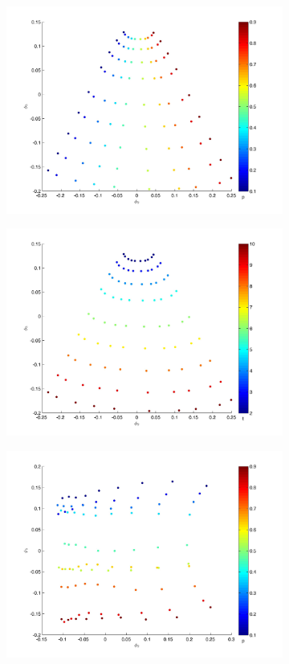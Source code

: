 \documentclass[12pt]{article}
\begin{document}
\begin{figure}[htb]
\begin{subfigure}{0.5\textwidth}
\includegraphics[width=\textwidth]{EMD_p_1}
\caption{}
\end{subfigure}
\begin{subfigure}{0.5\textwidth}
\includegraphics[width=\textwidth]{EMD_t_1}
\caption{}
\end{subfigure}
\begin{subfigure}{0.5\textwidth}
\includegraphics[width=\textwidth]{EMD_p_400}

\end{subfigure}
\end{figure}
\end{document}
